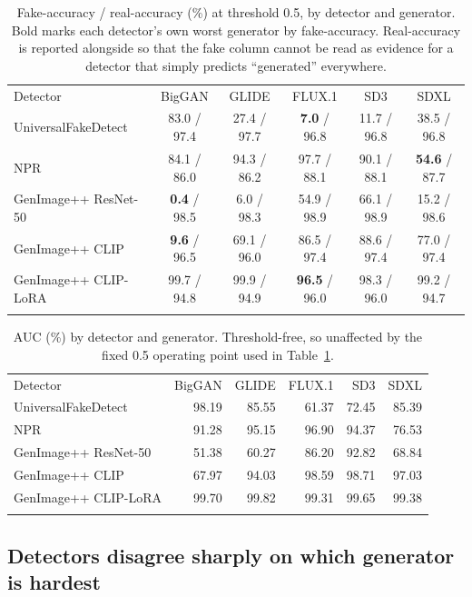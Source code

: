 \documentclass[3p,times,procedia]{elsarticle}
\begin{document}
\begin{table}[h]
\caption{Fake-accuracy / real-accuracy (\%) at threshold 0.5, by detector
and generator. Bold marks each detector's own worst generator by
fake-accuracy. Real-accuracy is reported alongside so that the fake column
cannot be read as evidence for a detector that simply predicts
``generated'' everywhere.}
\label{tab:results}
\begin{tabular*}{\hsize}{@{\extracolsep{\fill}}lccccc@{}}
\toprule
Detector & BigGAN & GLIDE & FLUX.1 & SD3 & SDXL \\
\colrule
UniversalFakeDetect & 83.0 / 97.4 & 27.4 / 97.7 & \textbf{7.0} / 96.8 & 11.7 / 96.8 & 38.5 / 96.8 \\
NPR & 84.1 / 86.0 & 94.3 / 86.2 & 97.7 / 88.1 & 90.1 / 88.1 & \textbf{54.6} / 87.7 \\
GenImage++ ResNet-50 & \textbf{0.4} / 98.5 & 6.0 / 98.3 & 54.9 / 98.9 & 66.1 / 98.9 & 15.2 / 98.6 \\
GenImage++ CLIP & \textbf{9.6} / 96.5 & 69.1 / 96.0 & 86.5 / 97.4 & 88.6 / 97.4 & 77.0 / 97.4 \\
GenImage++ CLIP-LoRA & 99.7 / 94.8 & 99.9 / 94.9 & \textbf{96.5} / 96.0 & 98.3 / 96.0 & 99.2 / 94.7 \\
\botrule
\end{tabular*}
\end{table}

\begin{table}[h]
\caption{AUC (\%) by detector and generator. Threshold-free, so unaffected
by the fixed 0.5 operating point used in Table~\ref{tab:results}.}
\label{tab:auc}
\begin{tabular*}{\hsize}{@{\extracolsep{\fill}}lrrrrr@{}}
\toprule
Detector & BigGAN & GLIDE & FLUX.1 & SD3 & SDXL \\
\colrule
UniversalFakeDetect & 98.19 & 85.55 & 61.37 & 72.45 & 85.39 \\
NPR & 91.28 & 95.15 & 96.90 & 94.37 & 76.53 \\
GenImage++ ResNet-50 & 51.38 & 60.27 & 86.20 & 92.82 & 68.84 \\
GenImage++ CLIP & 67.97 & 94.03 & 98.59 & 98.71 & 97.03 \\
GenImage++ CLIP-LoRA & 99.70 & 99.82 & 99.31 & 99.65 & 99.38 \\
\botrule
\end{tabular*}
\end{table}

\subsection{Detectors disagree sharply on which generator is hardest}
\label{sec:finding1}
\end{document}
